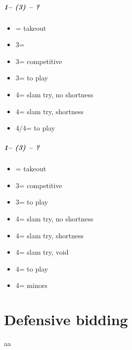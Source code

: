 \documentclass[12pt, a4paper]{report}
\begin{document}
\subsubsection*{1\spades -- (3\diams) -- ?}
\begin{itemize}
    \item \dbl = takeout
    \item 3\hearts = \hearts\ \gf
    \item 3\spades = competitive
    \item 3\nt = to play
    \item 4\clubs = slam try, no \diams shortness
    \item 4\diams = slam try, \diams shortness
    \item 4\hearts/4\spades = to play
\end{itemize}

\subsubsection*{1\spades -- (3\hearts) -- ?}
\begin{itemize}
    \item \dbl = takeout
    \item 3\spades = competitive
    \item 3\nt = to play
    \item 4\clubs = slam try, no \diams shortness
    \item 4\diams = slam try, \diams shortness
    \item 4\hearts = slam try, \hearts void
    \item 4\spades = to play
    \item 4\nt = minors
\end{itemize}

\part*{\colorbox{RoyalPurple!30}{Defensive bidding}}

aa
\end{document}
